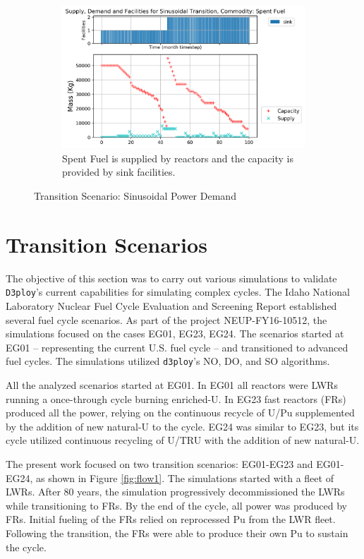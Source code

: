 \documentclass[11pt]{article}
\begin{document}
\begin{figure}[!htbp]
    \begin{subfigure}[t]{0.65\textwidth}
        \centering
        \includegraphics[width=\linewidth]{figures/sinetransition-spentfuel.png} 
        \caption{Spent Fuel is supplied by reactors and the capacity is provided by sink facilities.}
        \label{fig:sinetransition-spentfuel}
    \end{subfigure}
    \caption{Transition Scenario: Sinusoidal Power Demand}
\end{figure}

\pagebreak
\section{Transition Scenarios}

The objective of this section was to carry out various simulations to validate 
\texttt{D3ploy}'s current capabilities for simulating complex cycles.
The Idaho National Laboratory Nuclear Fuel Cycle Evaluation and Screening Report \cite{wigeland_nuclear_2014} established several fuel cycle scenarios.
As part of the project NEUP-FY16-10512, the simulations focused on the cases EG01, EG23, EG24. The scenarios started at EG01 -- representing the current U.S. fuel cycle -- and transitioned to advanced fuel cycles.
The simulations utilized \texttt{d3ploy}'s NO, DO, and SO algorithms.

All the analyzed scenarios started at EG01. In EG01 all reactors were LWRs running a  once-through cycle burning enriched-U.
In EG23 fast reactors (FRs) produced all the power, relying on the continuous recycle of U/Pu supplemented by the addition of new natural-U to the cycle.
EG24 was similar to EG23, but its cycle utilized continuous recycling of U/TRU with the addition of new natural-U.

The present work focused on two transition scenarios: EG01-EG23 and EG01-EG24,  as shown in Figure \ref{fig:flow1}. The simulations started with a fleet of LWRs. After 80 years, the simulation progressively decommissioned the LWRs while transitioning to FRs. By the end of the cycle, all power was produced by FRs. Initial fueling of the FRs relied on reprocessed Pu from the LWR fleet. Following the transition, the FRs were able to produce their own Pu to sustain the cycle.
\end{document}
